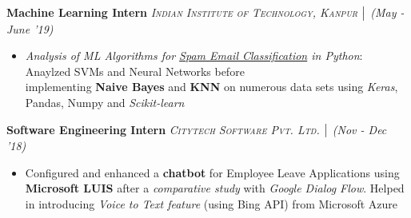 \documentclass{article}
\begin{document}
\vspace{-5pt}
\textbf{Machine Learning Intern} \hfill{\sl \small \textsc{Indian Institute of Technology, Kanpur} $\bigm|$ (May - June '19)}\\
\vspace{-19pt}
\begin{itemize}[itemsep = -1 mm, leftmargin=*]
    \item {\it Analysis of ML Algorithms for \underline{Spam Email Classification} in Python}: Anaylzed SVMs and Neural Networks before\\implementing {\bf Naive Bayes} and {\bf KNN} on numerous data sets using {\it Keras}, Pandas, Numpy and {\it Scikit-learn}
\end{itemize}
\vspace{-5pt}
\textbf{Software Engineering Intern} \hfill{\sl \small \textsc{Citytech Software Pvt. Ltd.} $\bigm|$ (Nov - Dec '18)}\\
\vspace{-19pt}
\begin{itemize}[itemsep = -1 mm, leftmargin=*]
  \item Configured and enhanced a {\bf chatbot} for Employee Leave Applications using {\bf Microsoft LUIS} after a {\sl comparative study} with {\it Google Dialog Flow}. Helped in introducing \textsl{Voice to Text feature} (using Bing API) from Microsoft Azure
\end{itemize}


\vspace{-20pt}
\end{document}

